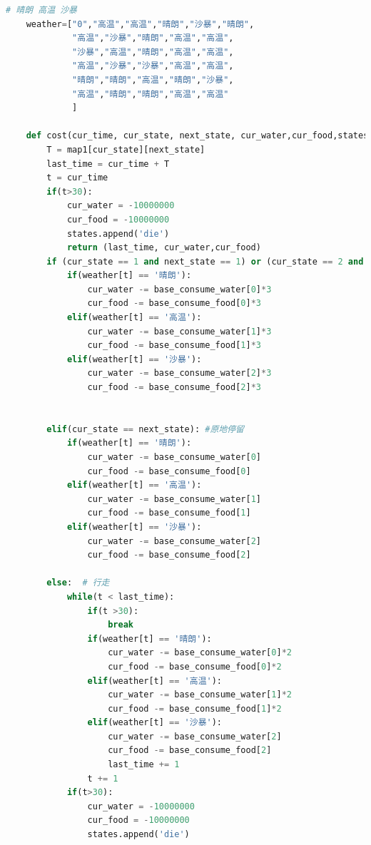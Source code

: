 \documentclass[withoutpreface,bwprint]{cumcmthesis} %
\begin{document}
\begin{appendices}
\begin{lstlisting}[language=python]
    # 晴朗 高温 沙暴
    weather=["0","高温","高温","晴朗","沙暴","晴朗",
             "高温","沙暴","晴朗","高温","高温",
             "沙暴","高温","晴朗","高温","高温",
             "高温","沙暴","沙暴","高温","高温",
             "晴朗","晴朗","高温","晴朗","沙暴",
             "高温","晴朗","晴朗","高温","高温"
             ]
    
    def cost(cur_time, cur_state, next_state, cur_water,cur_food,states):
        T = map1[cur_state][next_state]
        last_time = cur_time + T
        t = cur_time
        if(t>30):
            cur_water = -10000000
            cur_food = -10000000
            states.append('die')
            return (last_time, cur_water,cur_food)
        if (cur_state == 1 and next_state == 1) or (cur_state == 2 and next_state == 2): # 挖矿
            if(weather[t] == '晴朗'):
                cur_water -= base_consume_water[0]*3
                cur_food -= base_consume_food[0]*3
            elif(weather[t] == '高温'):
                cur_water -= base_consume_water[1]*3
                cur_food -= base_consume_food[1]*3
            elif(weather[t] == '沙暴'):
                cur_water -= base_consume_water[2]*3
                cur_food -= base_consume_food[2]*3
    
    
        elif(cur_state == next_state): #原地停留
            if(weather[t] == '晴朗'):
                cur_water -= base_consume_water[0]
                cur_food -= base_consume_food[0]
            elif(weather[t] == '高温'):
                cur_water -= base_consume_water[1]
                cur_food -= base_consume_food[1]
            elif(weather[t] == '沙暴'):
                cur_water -= base_consume_water[2]
                cur_food -= base_consume_food[2]
    
        else:  # 行走
            while(t < last_time):
                if(t >30):
                    break
                if(weather[t] == '晴朗'):
                    cur_water -= base_consume_water[0]*2
                    cur_food -= base_consume_food[0]*2
                elif(weather[t] == '高温'):
                    cur_water -= base_consume_water[1]*2
                    cur_food -= base_consume_food[1]*2
                elif(weather[t] == '沙暴'):
                    cur_water -= base_consume_water[2]
                    cur_food -= base_consume_food[2]
                    last_time += 1
                t += 1
            if(t>30):
                cur_water = -10000000
                cur_food = -10000000
                states.append('die')
                

\end{lstlisting}
\end{appendices}
\end{document}
